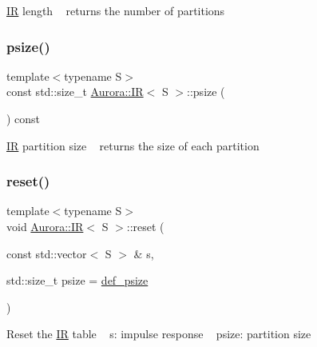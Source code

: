 \hyperlink{class_aurora_1_1_i_r}{IR} length ~\newline
returns the number of partitions \mbox{\label{class_aurora_1_1_i_r_a6243d747aeccbe57b2e18cb34a806d70}} 
\subsubsection{\texorpdfstring{psize()}{psize()}}
{\footnotesize\ttfamily template$<$typename S$>$ \\
const std\+::size\+\_\+t \hyperlink{class_aurora_1_1_i_r}{Aurora\+::\+IR}$<$ S $>$\+::psize (\begin{DoxyParamCaption}{ }\end{DoxyParamCaption}) const\hspace{0.3cm}{\ttfamily [inline]}}

\hyperlink{class_aurora_1_1_i_r}{IR} partition size ~\newline
returns the size of each partition \mbox{\label{class_aurora_1_1_i_r_a78acfa992e609aee2661a2c72c7bbd8f}} 
\subsubsection{\texorpdfstring{reset()}{reset()}}
{\footnotesize\ttfamily template$<$typename S$>$ \\
void \hyperlink{class_aurora_1_1_i_r}{Aurora\+::\+IR}$<$ S $>$\+::reset (\begin{DoxyParamCaption}\item[{const std\+::vector$<$ S $>$ \&}]{s,  }\item[{std\+::size\+\_\+t}]{psize = {\ttfamily \hyperlink{namespace_aurora_a080d03c33477d9c6322278722ca8e472}{def\+\_\+psize}} }\end{DoxyParamCaption})\hspace{0.3cm}{\ttfamily [inline]}}

Reset the \hyperlink{class_aurora_1_1_i_r}{IR} table ~\newline
s\+: impulse response ~\newline
psize\+: partition size \mbox{\label{class_aurora_1_1_i_r_a2463850b1167583c7338025b204ed631}} 
